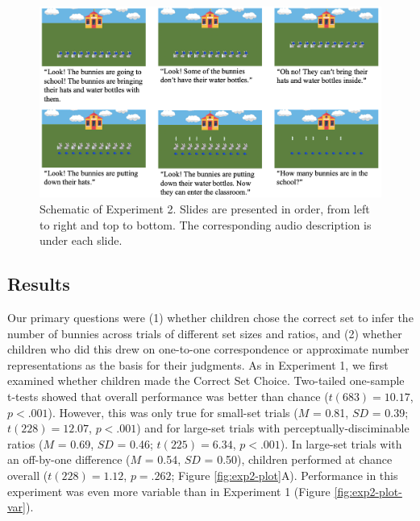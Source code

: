\documentclass[
  man,floatsintext]{apa7}
\begin{document}
\begin{figure}[h]

{\centering \includegraphics[width=1\linewidth]{figs/exp2} 

}

\caption{Schematic of Experiment 2. Slides are presented in order, from left to right and top to bottom. The corresponding audio description is under each slide.}\label{fig:exp2-figure}
\end{figure}

\subsection{Results}\label{results-1}

Our primary questions were (1) whether children chose the correct set to infer the number of bunnies across trials of different set sizes and ratios, and (2) whether children who did this drew on one-to-one correspondence or approximate number representations as the basis for their judgments. As in Experiment 1, we first examined whether children made the Correct Set Choice. Two-tailed one-sample t-tests showed that overall performance was better than chance (\(t(683) = 10.17\), \(p < .001\)).
However, this was only true for small-set trials (\(M\) = 0.81, \(SD\) = 0.39; \(t(228) = 12.07\), \(p < .001\)) and for large-set trials with perceptually-disciminable ratios (\(M\) = 0.69, \(SD\) = 0.46; \(t(225) = 6.34\), \(p < .001\)). In large-set trials with an off-by-one difference (\(M\) = 0.54, \(SD\) = 0.50), children performed at chance overall (\(t(228) = 1.12\), \(p = .262\); Figure \ref{fig:exp2-plot}A). Performance in this experiment was even more variable than in Experiment 1 (Figure \ref{fig:exp2-plot-var}).
\end{document}
